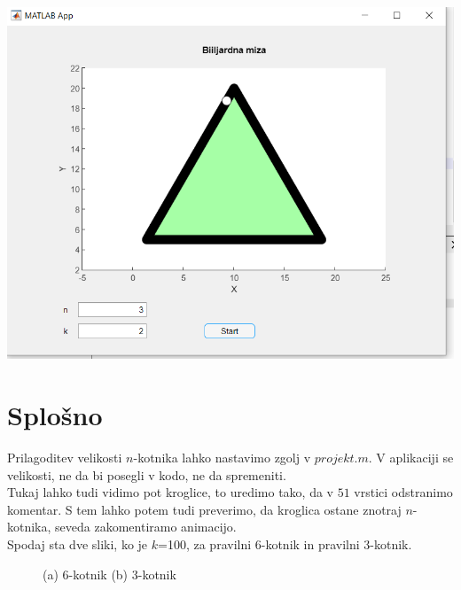 \documentclass[12pt]{article}
\begin{document}
\centering
\includegraphics[scale=0.85]{app6.png}
\newpage	

\section{Splošno}

\begin{flushleft}
	Prilagoditev velikosti $n$-kotnika lahko nastavimo zgolj v $projekt.m$. V aplikaciji se velikosti, ne da bi posegli v kodo, ne da spremeniti.\\
	Tukaj lahko tudi vidimo pot kroglice, to uredimo tako, da v $51$ vrstici odstranimo komentar. S tem lahko potem tudi preverimo, da kroglica ostane znotraj $n$-kotnika, seveda zakomentiramo animacijo.\\
	Spodaj sta dve sliki, ko je $k$=100, za pravilni 6-kotnik in pravilni 3-kotnik.
\end{flushleft}


\begin{figure}[!htb]
	\centering
	\caption{(a) 6-kotnik (b) 3-kotnik}
\end{figure}	
\end{document}
